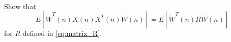\documentclass[journal,12pt,twocolumn]{IEEEtran}
\begin{document}
\begin{problem}
Show that 
\begin{equation}
E[\tilde W^{T}(n)X(n) X^{T}(n) \tilde W(n)] = E[\tilde W^{T}(n) R \tilde W(n)]
\end{equation}
%
for $R$ defined in \eqref{eq:matrix_R}.
\end{problem}
\end{document}
